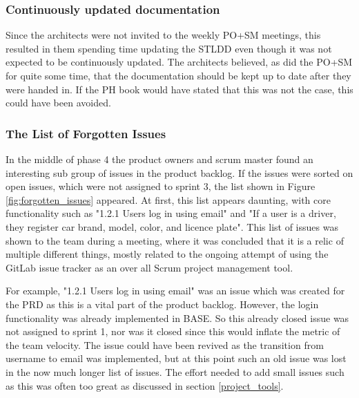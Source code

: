 \documentclass{article}
\begin{document}
\subsubsection{Continuously updated documentation}
Since the architects were not invited to the weekly PO+SM meetings, this resulted in them spending time updating the STLDD even though it was not expected to be continuously updated. The architects believed, as did the PO+SM for quite some time, that the documentation should be kept up to date after they were handed in. If the PH book would have stated that this was not the case, this could have been avoided.



\subsubsection{The List of Forgotten Issues} \label{forgotten}
In the middle of phase 4 the product owners and scrum master found an interesting sub group of issues in the product backlog. If the issues were sorted on open issues, which were not assigned to sprint 3, the list shown in Figure \ref{fig:forgotten_issues} appeared. At first, this list appears daunting, with core functionality such as "1.2.1 Users log in using email" and "If a user is a driver, they register car brand, model, color, and licence plate". This list of issues was shown to the team during a meeting, where it was concluded that it is a relic of multiple different things, mostly related to the ongoing attempt of using the GitLab issue tracker as an over all Scrum project management tool.

For example, "1.2.1 Users log in using email" was an issue which was created for the PRD as this is a vital part of the product backlog. However, the login functionality was already implemented in BASE. So this already closed issue was not assigned to sprint 1, nor was it closed since this would inflate the metric of the team velocity. The issue could have been revived as the transition from username to email was implemented, but at this point such an old issue was lost in the now much longer list of issues. The effort needed to add small issues such as this was often too great as discussed in section \ref{project_tools}.
\end{document}
